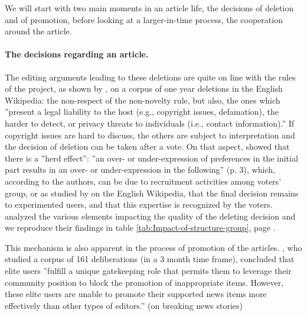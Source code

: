 We will start with two main moments in an article life, the decisions
of deletion and of promotion, before looking at a larger-in-time process,
the cooperation around the article.

\paragraph{The decisions regarding an article.}

The editing arguments leading to these deletions are quite on line
with the rules of the project, as shown by \citet{WestLee11}, on
a corpus of one year deletions in the English Wikipedia: the non-respect
of the non-novelty rule, but also, the ones which ''present a legal
liability to the host (e.g., copyright issues, defamation), the harder
to detect, or privacy threats to individuals (i.e., contact information).''
If copyright issues are hard to discuss, the others are subject to
interpretation and the decision of deletion can be taken after a vote.
On that aspect, \citet{TaraborelliCiampaglia10} showed that there
is a ''herd effect'': ''an over- or under-expression of preferences
in the initial part results in an over- or under-expression in the
following'' (p. 3), which, according to the authors, can be due to
recruitment activities among voters' group, or as studied by \citet{GeigerFord11}
on the English Wikipedia, that the final decision remains to experimented
users, and that this expertise is recognized by the voters. \citet{LamKarimRiedl10}
analyzed the various elements impacting the quality of the deleting
decision and we reproduce their findings in table \ref{tab:Impact-of-structure-group},
page \pageref{tab:Impact-of-structure-group}.


This mechanism is also apparent in the process of promotion of the
articles. \citet{KeeganGergle10}, who studied a corpus of 161 deliberations
(in a 3 month time frame), concluded that elite users ''fulfill a
unique gatekeeping role that permits them to leverage their community
position to block the promotion of inappropriate items. However, these
elite users are unable to promote their supported news items more
effectively than other types of editors.'' (on breaking news stories)

